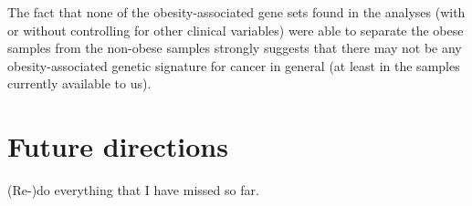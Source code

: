 \documentclass[a4paper, 11pt]{article}
\begin{document}
The fact that none of the obesity-associated gene sets found in the analyses (with or without controlling for other clinical variables) were able to separate the obese samples from the non-obese samples strongly suggests that there may not be any obesity-associated genetic signature for cancer in general (at least in the samples currently available to us).\\




\section*{Future directions}

(Re-)do everything that I have missed so far.
\end{document}
